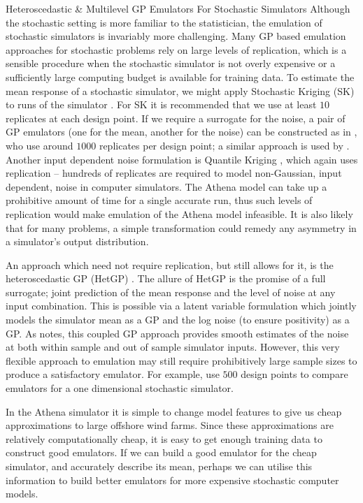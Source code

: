 \begin{chapter}{Heteroscedastic \& Multilevel GP Emulators For Stochastic Simulators\label{Ch:Hetsml}}
Although the stochastic setting is more familiar to the statistician, the emulation of stochastic simulators is invariably more challenging. Many GP based emulation approaches for stochastic problems rely on large levels of replication, which is a sensible procedure when the stochastic simulator is not overly expensive or a sufficiently large computing budget is available for training data. To estimate the mean response of a stochastic simulator, we might apply Stochastic Kriging (SK) to runs of the simulator \citep{Akenman2010}. For SK it is recommended that we use at least $10$ replicates at each design point. If we require a surrogate for the noise, a pair of GP emulators (one for the mean, another for the noise) can be constructed as in \citet{Henderson09}, who use around $1000$ replicates per design point; a similar approach is used by \citet{Andrianakis2017}. Another input dependent noise formulation is Quantile Kriging \citep{Plumlee2014}, which again uses replication -- hundreds of replicates are required to model non-Gaussian, input dependent, noise in computer simulators.  The Athena model can take up a prohibitive amount of time for a single accurate run, thus such levels of replication would make emulation of the Athena model infeasible. It is also likely that for many problems, a simple transformation could remedy any asymmetry in a simulator's output distribution.

An approach which need not require replication, but still allows for it, is the heteroscedastic GP (HetGP) \citep{Goldberg1998, hetGP}. The allure of HetGP is the promise of a full surrogate; joint prediction of the mean response and the level of noise at any input combination. This is possible via a latent variable formulation which jointly models the simulator mean as a GP and the log noise (to ensure positivity) as a GP. As \citet{Gramacy2020surrogates} notes, this coupled GP approach provides smooth estimates of the noise at both within sample and out of sample simulator inputs. However, this very flexible approach to emulation may still require prohibitively large sample sizes to produce a satisfactory emulator. For example, \citet{Binois2018} use $500$ design points to compare emulators for a one dimensional stochastic simulator.

In the Athena simulator it is simple to change model features to give us cheap approximations to large offshore wind farms. Since these approximations are relatively computationally cheap, it is easy to get enough training data to construct good emulators. If we can build a good emulator for the cheap simulator, and accurately describe its mean, perhaps we can utilise this information to build better emulators for more expensive stochastic computer models.


\end{chapter}
